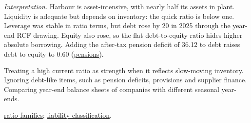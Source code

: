 \begin{qfmethod}
\emph{Interpretation.} Harbour is asset-intensive, with nearly half its assets in plant. Liquidity is adequate but depends on inventory: the quick ratio is below one. Leverage was stable in ratio terms, but debt rose by 20 in 2025 through the year-end RCF drawing. Equity also rose, so the flat debt-to-equity ratio hides higher absolute borrowing. Adding the after-tax pension deficit of 36.12 to debt raises debt to equity to 0.60 (\hyperref[meth:post-employment-benefit-modelling]{pensions}).

 Treating a high current ratio as strength when it reflects slow-moving inventory. Ignoring debt-like items, such as pension deficits, provisions and supplier finance. Comparing year-end balance sheets of companies with different seasonal year-ends.

 \hyperref[meth:financial-ratio-families]{ratio families}; \hyperref[meth:financial-instruments-liabilities]{liability classification}.

\end{qfmethod}
